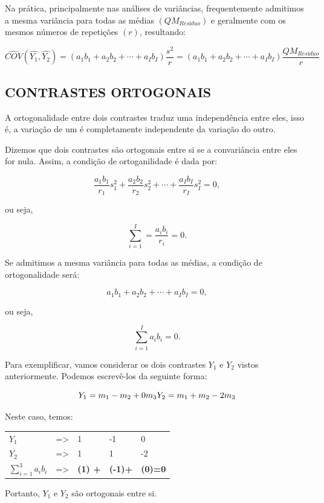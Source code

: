 \documentclass[
]{book}
\begin{document}
Na prática, principalmente nas análises de variâncias, frequentemente admitimos a mesma variância para todas as médias \((QM_{Resíduo})\) e geralmente com os mesmos números de repetições \((r)\), resultando:

\[
\hat{COV}(\hat{Y_1},\hat{Y_2}) = (a_1b_1 + a_2b_2 + \cdots + a_Ib_I) \frac{s^2}{r} = (a_1b_1 + a_2b_2 + \cdots + a_Ib_I) \frac{QM_{Resíduo}}{r}
\]

\hypertarget{contrastes-ortogonais}{%
\subsection{CONTRASTES ORTOGONAIS}\label{contrastes-ortogonais}}

A ortogonalidade entre dois contrastes traduz uma independência entre eles, isso é, a variação de um é completamente independente da variação do outro.

Dizemos que dois contrastes são ortogonais entre si se a convariância entre eles for nula. Assim, a condição de ortoganilidade é dada por:

\[
\frac{a_1b_1}{r_1}s_1^2+\frac{a_2b_2}{r_2}s_2^2+ \cdots + \frac{a_Ib_I}{r_I}s^2_I =0,
\]

ou seja,

\[
\sum_{i=1}^I=\frac{a_ib_i}{r_i}=0.
\]

Se admitimos a mesma variância para todas as médias, a condição de ortogonalidade será:

\[
a_1b_1+a_2b_2+ \cdots + a_Ib_I = 0,
\]

ou seja,

\[
\sum_{i=1}^I a_ib_i=0.
\]

Para exemplificar, vamos considerar os dois contrastes \(Y_1\) e \(Y_2\) vistos anteriormente. Podemos escrevê-los da seguinte forma:

\[
Y_1= m_1-m_2 +0m_3 \\
Y_2 = m_1+m_2-2m_3
\]

Neste caso, temos:

\begin{longtable}[]{@{}lllll@{}}
\toprule
\texttt{} & \texttt{} & \texttt{} & \texttt{} & \texttt{}\tabularnewline
\midrule
\endhead
\(Y_1\) & =\textgreater{} & 1 & -1 & 0\tabularnewline
\(Y_2\) & =\textgreater{} & 1 & 1 & -2\tabularnewline
\(\sum_{i=1}^3a_ib_i\) & =\textgreater{} & \textbf{(1) +} & \textbf{(-1)+} & \textbf{(0)=0}\tabularnewline
\bottomrule
\end{longtable}

Portanto, \(Y_1\) e \(Y_2\) são ortogonais entre si.
\end{document}
